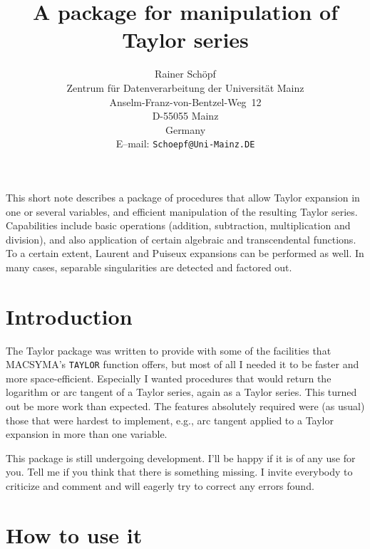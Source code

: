 \newcommand{\MACSYMA}{{\sf MACSYMA}}
\newcommand{\MAPLE}{{\sf MAPLE}}
\newcommand{\Mathematica}{{\sf Mathematica}}
\newcommand{\PSL}{{\sf PSL}}
\title{A \REDUCE{} package for manipulation of Taylor series}
\date{}
\author{Rainer Sch\"opf\\
Zentrum f\"ur Datenverarbeitung der Universit\"at Mainz\\
Anselm-Franz-von-Bentzel-Weg~12\\
D-55055 Mainz\\
Germany\\
E--mail: {\tt Schoepf@Uni-Mainz.DE}}

\maketitle
{} 

This short note describes a package of \REDUCE{} procedures that allow
Taylor expansion in one or several variables, and efficient
manipulation of the resulting Taylor series. Capabilities include
basic operations (addition, subtraction, multiplication and division),
and also application of certain algebraic and transcendental
functions. To a certain extent, Laurent and Puiseux expansions can be
performed as well. In many cases, separable singularities are detected
and factored out.

\section{Introduction}

The Taylor package was written to provide \REDUCE{} with some of
the facilities
that \MACSYMA's \verb+TAYLOR+ function offers,
but most of all I needed it to be faster and
more space-efficient.
Especially I wanted procedures that would return the logarithm or
arc tangent of a Taylor series, again as a Taylor series.
This turned out be more work than expected. The features absolutely
required were (as usual) those that were hardest to implement,
e.g., arc tangent applied to a Taylor expansion in more than
one variable.

This package is still undergoing development.
I'll be happy if it is of any use for you.
Tell me if you think that there is something missing.
I invite everybody to criticize and comment and will eagerly try to
correct any errors found.

\section{How to use it}

